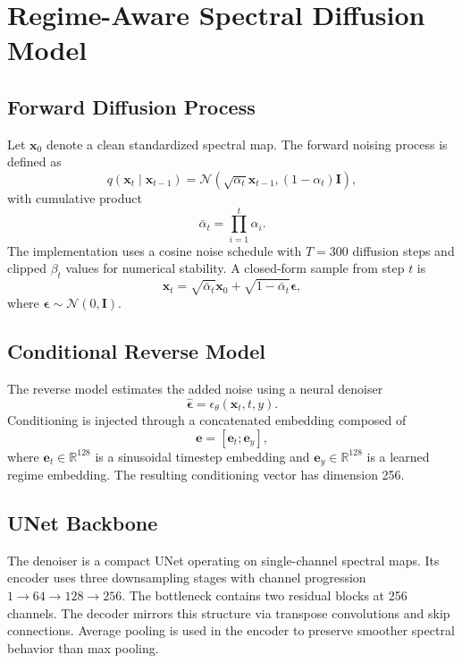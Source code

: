 \documentclass[conference]{IEEEtran}
\begin{document}
\section{Regime-Aware Spectral Diffusion Model}
\subsection{Forward Diffusion Process}
Let $\mathbf{x}_0$ denote a clean standardized spectral map. The forward noising process is defined as
\begin{equation}
q(\mathbf{x}_t \mid \mathbf{x}_{t-1}) = \mathcal{N}\left(\sqrt{\alpha_t}\mathbf{x}_{t-1}, (1-\alpha_t)\mathbf{I}\right),
\end{equation}
with cumulative product
\begin{equation}
\bar{\alpha}_t = \prod_{i=1}^{t}\alpha_i.
\end{equation}
The implementation uses a cosine noise schedule with $T=300$ diffusion steps and clipped $\beta_t$ values for numerical stability. A closed-form sample from step $t$ is
\begin{equation}
\mathbf{x}_t = \sqrt{\bar{\alpha}_t}\mathbf{x}_0 + \sqrt{1-\bar{\alpha}_t}\boldsymbol{\epsilon},
\end{equation}
where $\boldsymbol{\epsilon}\sim\mathcal{N}(0,\mathbf{I})$.

\subsection{Conditional Reverse Model}
The reverse model estimates the added noise using a neural denoiser
\begin{equation}
\hat{\boldsymbol{\epsilon}} = \epsilon_{\theta}(\mathbf{x}_t, t, y).
\end{equation}
Conditioning is injected through a concatenated embedding composed of
\begin{equation}
\mathbf{e} = [\mathbf{e}_t ; \mathbf{e}_y],
\end{equation}
where $\mathbf{e}_t \in \mathbb{R}^{128}$ is a sinusoidal timestep embedding and $\mathbf{e}_y \in \mathbb{R}^{128}$ is a learned regime embedding. The resulting conditioning vector has dimension 256.

\subsection{UNet Backbone}
The denoiser is a compact UNet operating on single-channel spectral maps. Its encoder uses three downsampling stages with channel progression $1 \rightarrow 64 \rightarrow 128 \rightarrow 256$. The bottleneck contains two residual blocks at 256 channels. The decoder mirrors this structure via transpose convolutions and skip connections. Average pooling is used in the encoder to preserve smoother spectral behavior than max pooling.
\end{document}
